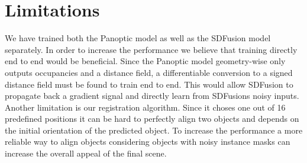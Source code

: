 \section{Limitations}
\label{sec:limitations}

We have trained both the Panoptic model as well as the SDFusion model separately. In order to increase the performance we believe that training directly end to end would be beneficial. Since the Panoptic model geometry-wise only outputs occupancies and a distance field, a differentiable conversion to a signed distance field must be found to train end to end. This would allow SDFusion to propagate back a gradient signal and directly learn from SDFusions noisy inputs. Another limitation is our registration algorithm. Since it choses one out of 16 predefined positions it can be hard to perfectly align two objects and depends on the initial orientation of the predicted object. To increase the performance a more reliable way to align objects considering objects with noisy instance masks can increase the overall appeal of the final scene.